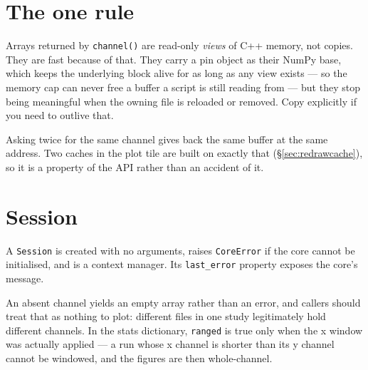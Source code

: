 \documentclass[11pt,a4paper,oneside]{report}
\newcommand{\code}[1]{\texttt{#1}}
\begin{document}
\section{The one rule}

Arrays returned by \code{channel()} are read-only \emph{views} of C++ memory,
not copies. They are fast because of that. They carry a pin object as their
NumPy base, which keeps the underlying block alive for as long as any view
exists --- so the memory cap can never free a buffer a script is still reading
from --- but they stop being meaningful when the owning file is reloaded or
removed. Copy explicitly if you need to outlive that.

Asking twice for the same channel gives back the same buffer at the same
address. Two caches in the plot tile are built on exactly that
(\S\ref{sec:redrawcache}), so it is a property of the API rather than an
accident of it.

\section{Session}

A \code{Session} is created with no arguments, raises \code{CoreError} if the
core cannot be initialised, and is a context manager. Its \code{last\_error}
property exposes the core's message.

An absent channel yields an empty array rather than an error, and callers should
treat that as nothing to plot: different files in one study legitimately hold
different channels. In the stats dictionary, \code{ranged} is true only when the
x window was actually applied --- a run whose x channel is shorter than its y
channel cannot be windowed, and the figures are then whole-channel.
\end{document}
